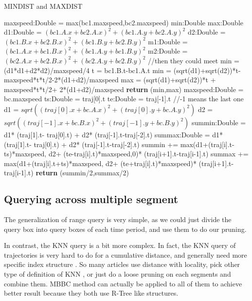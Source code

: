\documentclass[sigplan]{acmart}
\begin{document}
\begin{algorithm}
\caption{MINDIST and MAXDIST} \label{alg:minmax}
\begin{algorithmic}[1]
    \State maxspeed:Double = max(bc1.maxspeed,bc2.maxspeed)
    \State min:Double
    \State max:Double
    \State d1:Double = $(bc1.A.x+bc2.A.x)^2+(bc1.A.y+bc2.A.y)^2$
    \State d2:Double = $(bc1.B.x+bc2.B.x)^2+(bc1.B.y+bc2.B.y)^2$
    \State m1:Double = $(bc1.A.x+bc1.B.x)^2+(bc1.A.y+bc1.B.y)^2$
    \State m2:Double = $(bc2.A.x+bc2.B.x)^2+(bc2.A.y+bc2.B.y)^2$
     //then they could meet
        \State min = (d1*d1+d2*d2)/maxspeed/4
    \Else
        \State t = bc1.B.t-bc1.A.t
        \State min = (sqrt(d1)+sqrt(d2))*t-maxspeed*t*t/2-2*(d1+d2)/maxspeed
    \EndIf
    \State max = (sqrt(d1)+sqrt(d2))*t + maxspeed*t*t/2+ 2*(d1+d2)/maxspeed
    \State \textbf{return} (min,max)
\EndFunction
{}
    \State maxspeed:Double = bc.maxspeed
    \State ts:Double = traj[0].t
    \State te:Double = traj[-1].t //-1 means the last one
    \State d1 = $sqrt((traj[0].x+bc.A.x)^2+(traj[0].y+bc.A.y)^2)$
    \State d2 = $sqrt((traj[-1].x+bc.B.x)^2+(traj[-1].y+bc.B.y)^2)$
    \State summin:Double = d1* (traj[1].t- traj[0].t) + d2* (traj[-1].t-traj[-2].t)
    \State summax:Double = d1* (traj[1].t- traj[0].t) + d2* (traj[-1].t-traj[-2].t)
        \State summin += max(d1+(traj[i].t-ts)*maxspeed, d2+ (te-traj[i].t)*maxspeed,0)* (traj[i+1].t-traj[i-1].t)
        \State summax += max(d1+(traj[i].t+ts)*maxspeed, d2+ (te+traj[i].t)*maxspeed)* (traj[i+1].t-traj[i-1].t)
    \EndFor
    \State \textbf{return} (summin/2,summax/2)
\EndFunction
\end{algorithmic}
\end{algorithm}

\subsection{Querying across multiple segment}
The generalization of range query is very simple, as we could just divide the query box into query boxes of each time period, and use them to do our pruning. \par
In contrast, the KNN query is a bit more complex. In fact, the KNN query of trajectories is very hard to do for a cumulative distance, and generally need more specific index structure \cite{shang2018dita}. So many articles use distance with locality\cite{xie2017distributed}, pick other type of definition of KNN \cite{ding2018ultraman}, or just do a loose pruning on each segments and combine them\cite{zhang2017trajspark}. MBBC method can actually be applied to all of them to achieve better result because they both use R-Tree like structures.
\end{document}
